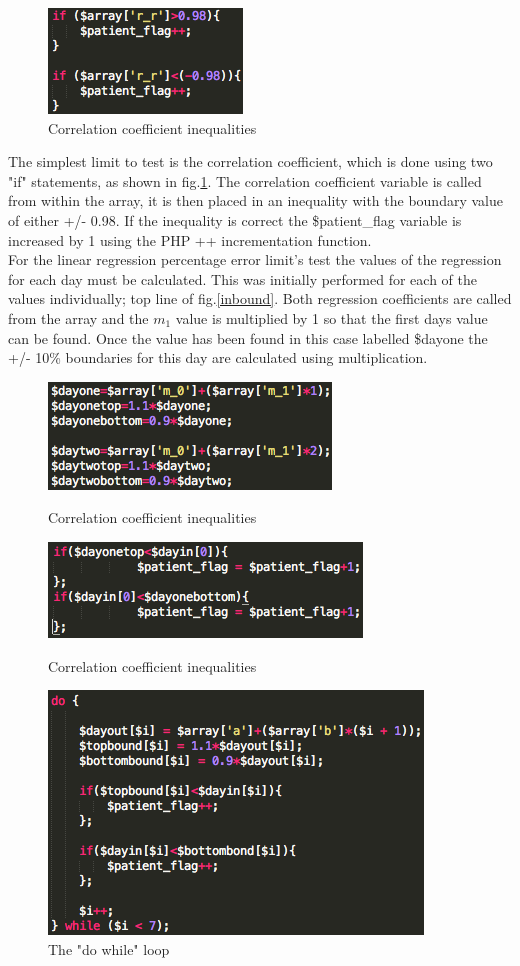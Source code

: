 \documentclass[11pt]{article}
\begin{document}
\begin{figure}
\centering
\includegraphics[scale=0.6]{corrcheck}
\caption{Correlation coefficient inequalities \label{corrcheck}} 
\end{figure} 
The simplest limit to test is the correlation coefficient, which is done using two "if" statements, as shown in fig.\ref{corrcheck}. The correlation coefficient variable is called from within the array, it is then placed in an inequality with the boundary value of either +/- 0.98. If the inequality is correct the \$patient\_flag variable is increased by 1 using the PHP ++ incrementation function.
\\ \indent
For the linear regression percentage error limit's test the values of the regression for each day must be calculated. This was initially performed for each of the values individually; top line of fig.\ref{inbound}. Both regression coefficients are called from the array and the $m_1$ value is multiplied by 1 so that the first days value can be found. Once the value has been found in this case labelled \$dayone the +/- 10\% boundaries for this day are calculated using multiplication. 
\begin{figure}
\centering
\includegraphics[scale=0.6]{linbound}
\caption{Correlation coefficient inequalities \label{inbound}} 
\includegraphics[scale=0.6]{boundtest1}
\caption{Correlation coefficient inequalities} 
\includegraphics[scale=0.6]{dowhile}
\caption{The "do while" loop \label{dowhile}} 
\end{figure} 
\end{document}
